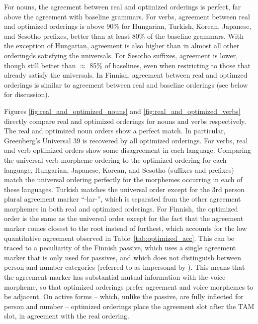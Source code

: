 \documentclass[11pt,letterpaper]{article}
\newcommand{\citep}{\parencite}
\begin{document}
For nouns, the agreement between real and optimized orderings is perfect, far above the agreement with baseline grammars. 
For verbs, agreement between real and optimized orderings is above 90\% for Hungarian, Turkish, Korean, Japanese, and Sesotho prefixes, better than at least 80\% of the baseline grammars.
With the exception of Hungarian, agreement is also higher than in almost all other orderingds satisfying the universals.
For Sesotho suffixes, agreement is lower, though still better than $\approx$ 85\% of baselines, even when restricting to those that already satisfy the universals.
In Finnish, agreement between real and optimzed orderings is similar to agreement between real and baseline orderings (see below for discussion).

Figures \ref{fig:real_and_optimized_nouns} and \ref{fig:real_and_optimized_verbs} directly compare real and optimized orderings for nouns and verbs respectively.
The real and optimized noun orders show a perfect match.
In particular, Greenberg's Universal 39 is recovered by all optimized orderings.
For verbs, real and verb optimized orders show some disagreement in each language.
Comparing the universal verb morpheme ordering to the optimized ordering for each language, Hungarian, Japanese, Korean, and Sesotho (suffixes and prefixes) match the universal ordering perfectly for the morphemes occurring in each of these languages. 
Turkish matches the universal order except for the 3rd person plural agreement marker ``-lar-'', which is separated from the other agreement morphemes in both real and optimized orderings.
For Finnish, the optimized order is the same as the universal order except for the fact that the agreement marker comes closest to the root instead of furthest, which accounts for the low quantitative agreement observed in Table~\ref{tab:optimized_acc}.
This can be traced to a peculiarity of the Finnish passive, which uses a single agreement marker that is only used for passives, and which does not distinguish between person and number categories (referred to as impersonal by \citep[Section 69]{karlsson1999finnish}).
This means that the agreement marker has substantial mutual information with the voice morpheme, so that optimized orderings prefer agreement and voice morphemes to be adjacent.
On active forms -- which, unlike the passive, are fully inflected for person and number -- optimized orderings place the agreement slot after the TAM slot, in agreement with the real ordering.
\end{document}
